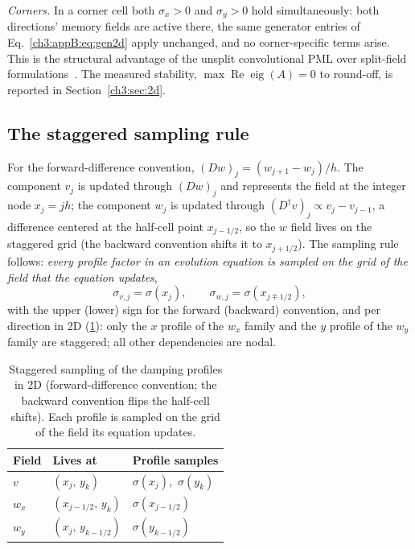 \emph{Corners.}  In a corner cell both $\sigma_x>0$ and $\sigma_y>0$
hold simultaneously: both directions' memory fields are active there,
the same generator entries of Eq.~\eqref{ch3:appB:eq:gen2d} apply
unchanged, and no corner-specific terms arise.  This is the structural
advantage of the unsplit convolutional PML over split-field
formulations~\cite{roden2000cpml}.  The measured stability,
$\max\operatorname{Re}\operatorname{eig}(A)=0$ to round-off, is
reported in Section~\ref{ch3:sec:2d}.

\subsection{The staggered sampling rule}
\label{ch3:appB:stagger}

For the forward-difference convention, $(Dw)_j=(w_{j+1}-w_j)/h$.  The
component $v_j$ is updated through $(Dw)_j$ and represents the field at
the integer node $x_j=jh$; the component $w_j$ is updated through
$(D^{\dagger}v)_j\propto v_j-v_{j-1}$, a difference centered at the
half-cell point $x_{j-1/2}$, so the $w$ field lives on the staggered
grid (the backward convention shifts it to $x_{j+1/2}$).  The sampling
rule follows: \emph{every profile factor in an evolution equation is
sampled on the grid of the field that the equation updates},
\begin{equation}
  \sigma_{v,j}=\sigma(x_j),
  \qquad
  \sigma_{w,j}=\sigma(x_{j\mp1/2}),
  \label{ch3:appB:eq:staggerrule}
\end{equation}
with the upper (lower) sign for the forward (backward) convention,
and per direction in 2D (\ref{ch3:appB:tab:stagger}): only the $x$
profile of the $w_x$ family and the $y$ profile of the $w_y$ family are
staggered; all other dependencies are nodal.

\begin{table}
\caption{Staggered sampling of the damping profiles in 2D
(forward-difference convention; the backward convention flips the
half-cell shifts).  Each profile is sampled on the grid of the field
its equation updates.}
\label{ch3:appB:tab:stagger}
\begin{tabular}{lll}
\toprule
Field & Lives at & Profile samples \\
\midrule
$v$   & $(x_j,\,y_k)$         & $\sigma(x_j)$,\ $\sigma(y_k)$ \\
$w_x$ & $(x_{j-1/2},\,y_k)$   & $\sigma(x_{j-1/2})$ \\
$w_y$ & $(x_j,\,y_{k-1/2})$   & $\sigma(y_{k-1/2})$ \\
\bottomrule
\end{tabular}
\end{table}

